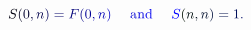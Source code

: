 \documentclass[12pt]{article}
\begin{document}
\makeatletter
\renewcommand*{\@textcolor}[3]{%
  \protect\leavevmode
  \begingroup
    \color#1{#2}#3%
  \endgroup
}
\makeatother
\begin{displaymath}
\mathcolor[RGB]{0,0,15}{S} \mathcolor[RGB]{0,0,30}{(} \mathcolor[RGB]{0,0,45}{0} \mathcolor[RGB]{0,0,60}{,} \mathcolor[RGB]{0,0,75}{n} \mathcolor[RGB]{0,0,90}{)} \mathcolor[RGB]{0,0,105}{=} \mathcolor[RGB]{0,0,120}{F} \mathcolor[RGB]{0,0,135}{(} \mathcolor[RGB]{0,0,150}{0} \mathcolor[RGB]{0,0,165}{,} \mathcolor[RGB]{0,0,180}{n} \mathcolor[RGB]{0,0,195}{)} \quad \mathrm { ~ \mathcolor[RGB]{0,0,210}{a} \mathcolor[RGB]{0,0,225}{n} \mathcolor[RGB]{0,0,240}{d} ~ } \quad \mathcolor[RGB]{0,0,255}{S} \mathcolor[RGB]{0,15,0}{(} \mathcolor[RGB]{0,15,15}{n} \mathcolor[RGB]{0,15,30}{,} \mathcolor[RGB]{0,15,45}{n} \mathcolor[RGB]{0,15,60}{)} \mathcolor[RGB]{0,15,75}{=} \mathcolor[RGB]{0,15,90}{1} \mathcolor[RGB]{0,15,105}{.}
\end{displaymath}
\end{document}
